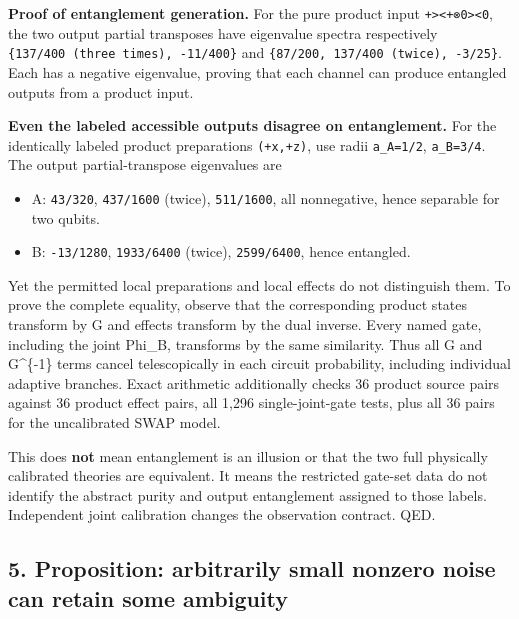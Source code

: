 \documentclass[
  10pt,
  a4paper,
]{article}
\providecommand{\tightlist}{%
  \setlength{\itemsep}{0pt}\setlength{\parskip}{0pt}}
\begin{document}
\textbf{Proof of entanglement generation.} For the pure product input \texttt{\textbar{}+\textgreater{}\textless{}+\textbar{}⊗\textbar{}0\textgreater{}\textless{}0\textbar{}}, the two output partial transposes have eigenvalue spectra respectively \texttt{\{137/400\ (three\ times),\ -11/400\}} and \texttt{\{87/200,\ 137/400\ (twice),\ -3/25\}}. Each has a negative eigenvalue, proving that each channel can produce entangled outputs from a product input.

\textbf{Even the labeled accessible outputs disagree on entanglement.} For the identically labeled product preparations \texttt{(+x,+z)}, use radii \texttt{a\_A=1/2}, \texttt{a\_B=3/4}. The output partial-transpose eigenvalues are

\begin{itemize}
\tightlist
\item
  A: \texttt{43/320}, \texttt{437/1600} (twice), \texttt{511/1600}, all nonnegative, hence separable for two qubits.
\item
  B: \texttt{-13/1280}, \texttt{1933/6400} (twice), \texttt{2599/6400}, hence entangled.
\end{itemize}

Yet the permitted local preparations and local effects do not distinguish them. To prove the complete equality, observe that the corresponding product states transform by G and effects transform by the dual inverse. Every named gate, including the joint Phi\_B, transforms by the same similarity. Thus all G and G\^{}\{-1\} terms cancel telescopically in each circuit probability, including individual adaptive branches. Exact arithmetic additionally checks 36 product source pairs against 36 product effect pairs, all 1,296 single-joint-gate tests, plus all 36 pairs for the uncalibrated SWAP model.

This does \textbf{not} mean entanglement is an illusion or that the two full physically calibrated theories are equivalent. It means the restricted gate-set data do not identify the abstract purity and output entanglement assigned to those labels. Independent joint calibration changes the observation contract. QED.

\subsection{5. Proposition: arbitrarily small nonzero noise can retain some ambiguity}\label{proposition-arbitrarily-small-nonzero-noise-can-retain-some-ambiguity}
\end{document}
